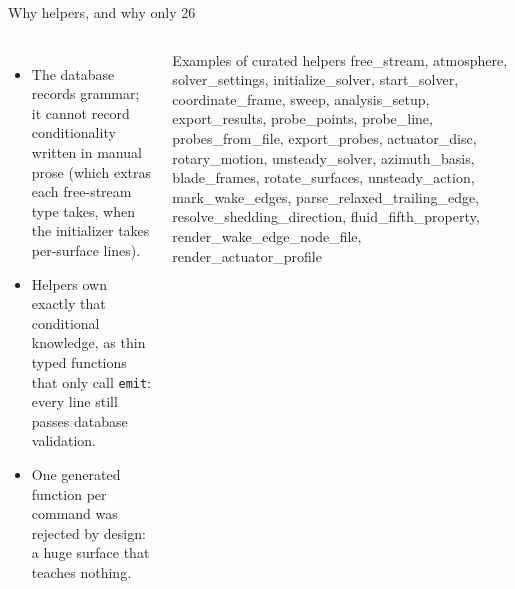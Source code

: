 \documentclass[aspectratio=169,10pt]{beamer}
\newcommand{\code}[1]{\texttt{\small #1}}
\begin{document}
\begin{frame}{Why helpers, and why only 26}
  \begin{columns}[T]
    \begin{itemize}
      \item The database records grammar; it cannot record conditionality written in manual prose (which extras each free-stream type takes, when the initializer takes per-surface lines).
      \item Helpers own exactly that conditional knowledge, as thin typed functions that only call \code{emit}: every line still passes database validation.
      \item One generated function per command was rejected by design: a huge surface that teaches nothing.
    \end{itemize}
    \small
    \begin{block}{Examples of curated helpers}
      free\_stream, atmosphere, solver\_settings, initialize\_solver, start\_solver, coordinate\_frame, sweep, analysis\_setup, export\_results, probe\_points, probe\_line, probes\_from\_file, export\_probes, actuator\_disc, rotary\_motion, unsteady\_solver, azimuth\_basis, blade\_frames, rotate\_surfaces, unsteady\_action, mark\_wake\_edges, parse\_relaxed\_trailing\_edge, resolve\_shedding\_direction, fluid\_fifth\_property, render\_wake\_edge\_node\_file, render\_actuator\_profile
    \end{block}
  \end{columns}
\end{frame}
\end{document}

